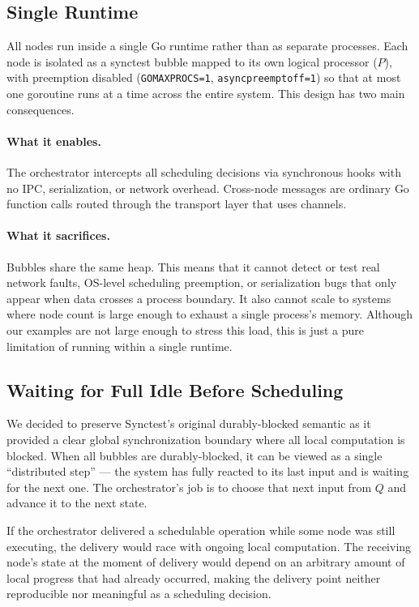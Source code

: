 \documentclass[11pt]{article}
\begin{document}
\subsection{Single Runtime}

All nodes run inside a single Go runtime rather than as separate processes. Each node is isolated as a synctest bubble mapped to its own logical processor ($P$), with preemption disabled (\texttt{GOMAXPROCS=1}, \texttt{asyncpreemptoff=1}) so that at most one goroutine runs at a time across the entire system. This design has two main consequences.

\paragraph{What it enables.} The orchestrator intercepts all scheduling decisions via synchronous hooks with no IPC, serialization, or network overhead. Cross-node messages are ordinary Go function calls routed through the transport layer that uses channels.

\paragraph{What it sacrifices.} Bubbles share the same heap. This means that it cannot detect or test real network faults, OS-level scheduling preemption, or serialization bugs that only appear when data crosses a process boundary. It also cannot scale to systems where node count is large enough to exhaust a single process's memory. Although our examples are not large enough to stress this load, this is just a pure limitation of running within a single runtime. 

\subsection{Waiting for Full Idle Before Scheduling}

We decided to preserve Synctest's original durably-blocked semantic as it provided a clear global synchronization boundary where all local computation is blocked. When all bubbles are durably-blocked, it can be viewed as a single ``distributed step'' --- the system has fully reacted to its last input and is waiting for the next one. The orchestrator's job is to choose that next input from $Q$ and advance it to the next state.

If the orchestrator delivered a schedulable operation while some node was still executing, the delivery would race with ongoing local computation. The receiving node's state at the moment of delivery would depend on an arbitrary amount of local progress that had already occurred, making the delivery point neither reproducible nor meaningful as a scheduling decision.
\end{document}
